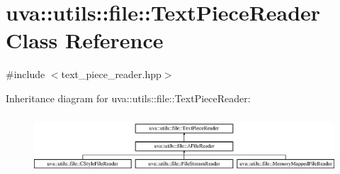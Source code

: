 \hypertarget{classuva_1_1utils_1_1file_1_1_text_piece_reader}{}\section{uva\+:\+:utils\+:\+:file\+:\+:Text\+Piece\+Reader Class Reference}
\label{classuva_1_1utils_1_1file_1_1_text_piece_reader}


{\ttfamily \#include $<$text\+\_\+piece\+\_\+reader.\+hpp$>$}

Inheritance diagram for uva\+:\+:utils\+:\+:file\+:\+:Text\+Piece\+Reader\+:\begin{figure}[H]
\begin{center}
\leavevmode
\includegraphics[height=2.222222cm]{classuva_1_1utils_1_1file_1_1_text_piece_reader}
\end{center}
\end{figure}
